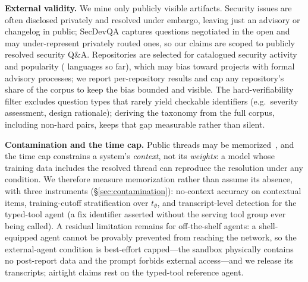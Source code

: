 \noindent\textbf{External validity.}
We mine only publicly visible artifacts. Security issues are often disclosed
privately and resolved under embargo, leaving just an advisory or changelog in
public; SecDevQA captures questions negotiated in the open and may
under-represent privately routed ones, so our claims are scoped to publicly
resolved security Q\&A. Repositories are selected for catalogued security
activity and popularity ( languages so far), which may bias toward
projects with formal advisory processes; we report per-repository results and
cap any repository's share of the corpus to keep the bias bounded and visible.
The hard-verifiability filter excludes question types that rarely yield
checkable identifiers (e.g.\ severity assessment, design rationale); deriving
the taxonomy from the full corpus, including non-hard pairs, keeps that gap
measurable rather than silent.

\noindent\textbf{Contamination and the time cap.}
Public threads may be memorized~\cite{stackrepoqa2025}, and the time cap
constrains a system's \emph{context}, not its \emph{weights}: a model whose
training data includes the resolved thread can reproduce the resolution under
any condition. We therefore measure memorization rather than assume its
absence, with three instruments (\S\ref{sec:contamination}): no-context
accuracy on contextual items, training-cutoff stratification over $t_\theta$, and
transcript-level detection for the typed-tool agent (a fix identifier asserted
without the serving tool group ever being called). A residual limitation
remains for off-the-shelf agents: a shell-equipped agent cannot be provably
prevented from reaching the network, so the external-agent condition is
best-effort capped---the sandbox physically contains no post-report data and
the prompt forbids external access---and we release its transcripts; airtight
claims rest on the typed-tool reference agent.
